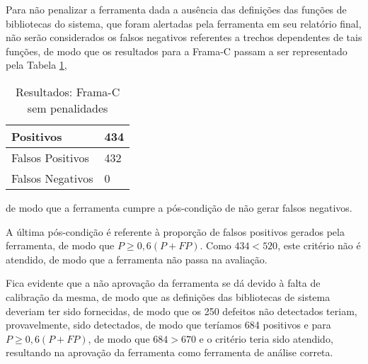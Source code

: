       Para não penalizar a ferramenta dada a ausência das definições das funções de bibliotecas do sistema, que foram alertadas pela ferramenta em seu relatório final, não serão considerados os falsos negativos referentes a trechos dependentes de tais funções, de modo que os resultados para a Frama-C passam a ser representado pela Tabela \ref{tabela_framac2},
\begin{table}[h]
\caption{Resultados: Frama-C sem penalidades}
  \centering
\begin{tabular}{l | l}
  \hline
  Positivos & 434 \\ \hline
  Falsos Positivos & 432 \\ \hline
  Falsos Negativos & 0 \\
  \hline
\end{tabular}
\label{tabela_framac2}
\end{table}
      de modo que a ferramenta cumpre a pós-condição de não gerar falsos negativos.

      A última pós-condição é referente à proporção de falsos positivos gerados pela ferramenta, de modo que
      $P \geq 0,6(P + FP)$.
      Como 
      $434 < 520$,
      este critério não é atendido, de modo que a ferramenta não passa na avaliação.

      Fica evidente que a não aprovação da ferramenta se dá devido à falta de calibração da mesma, de modo que as definições das bibliotecas de sistema deveriam ter sido fornecidas, de modo que os 250 defeitos não detectados teriam, provavelmente, sido detectados, de modo que teríamos 684 positivos e para
      $P \geq 0,6(P + FP)$,
      de modo que
      $684 > 670$
      e o critério teria sido atendido, resultando na aprovação da ferramenta como ferramenta de análise correta.
